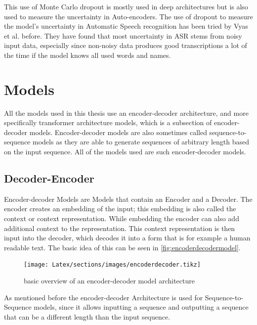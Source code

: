 This use of Monte Carlo dropout is mostly used in deep architectures but is also used to measure the uncertainty in Auto-encoders. \cite{gawlikowski2022surveyuncertaintydeepneural}
The use of dropout to measure the model's uncertainty in Automatic Speech recognition has been tried by Vyas et al. \cite{8683086} before.
They have found that most uncertainty in ASR stems from noisy input data, especially since non-noisy data produces good transcriptions a lot of the time if the model knows all used words and names. 

\section{Models}
\label{ch:models}
All the models used in this thesis use an encoder-decoder architecture, and more specifically transformer architecture models, which is a subsection of encoder-decoder models. Encoder-decoder models are also sometimes called sequence-to-sequence models as they are able to generate sequences of arbitrary length based on the input sequence.
All of the models used are such encoder-decoder models. 

\subsection{Decoder-Encoder}

Encoder-decoder Models are Models that contain an Encoder and a Decoder. The encoder creates an embedding of the input; this embedding is also called the context or context representation. While embedding the encoder can also add additional context to the representation. 
This context representation is then input into the decoder, which decodes it into a form that is for example a human readable text. 
The basic idea of this can be seen in \autoref{fig:encoderdecodermodel}.
\begin{figure}[ht]
    \centering%
    \texttt{[image: Latex/sections/images/encoderdecoder.tikz]}
    \caption{basic overview of an encoder-decoder model architecture}
    \label{fig:encoderdecodermodel}
\end{figure}

As mentioned before the encoder-decoder Architecture is used for Sequence-to-Sequence models, since it allows inputting a sequence and outputting a sequence that can be a different length than the input sequence. \cite[chapter~8.7]{jm3}

